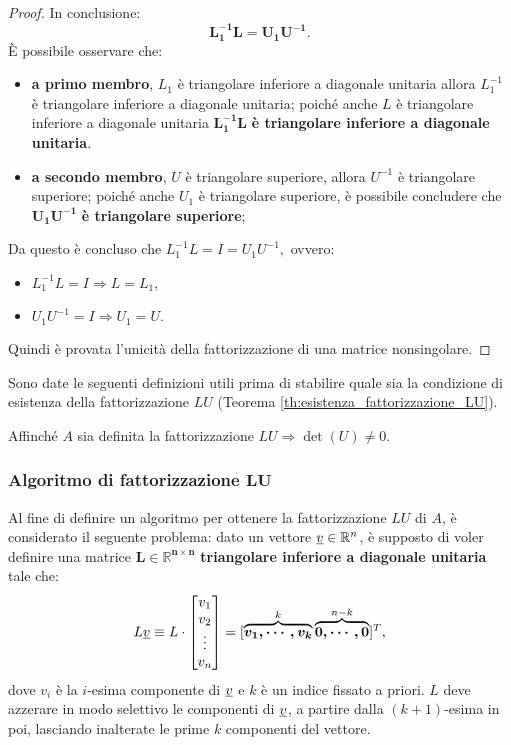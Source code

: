 \begin{proof}
    \noindent In conclusione: \begin{equation*}
        \boldsymbol{L_1^{-1}L}=\boldsymbol{U_1U^{-1}}.
    \end{equation*}
    È possibile osservare che:
    \begin{itemize}
    	\item \textbf{a primo membro}, $L_1$ è triangolare inferiore a diagonale unitaria allora $L_1^{-1}$ è triangolare inferiore a diagonale unitaria; poiché anche $L$ è triangolare inferiore a diagonale unitaria $\boldsymbol{L_1^{-1}L}$ \textbf{è triangolare inferiore a diagonale unitaria}.
        \item \textbf{a secondo membro}, $U$ è triangolare superiore, allora $U^{-1}$ è triangolare superiore; poiché anche $U_1$ è triangolare superiore, è possibile concludere che $\boldsymbol{U_1U^{-1}}$ \textbf{è triangolare superiore};
    \end{itemize}
    Da questo è concluso che $L_1^{-1}L=I=U_1U^{-1},$ ovvero:
    \begin{itemize}
        \item $L_1^{-1}L=I\Rightarrow L=L_1$,
        \item $U_1U^{-1}=I\Rightarrow U_1=U.$
    \end{itemize}
    Quindi è provata l'unicità della fattorizzazione di una matrice \gls{nonsingolare}.
\end{proof}

Sono date le seguenti definizioni utili prima di stabilire quale sia la condizione di esistenza della fattorizzazione $LU$ (Teorema \ref{th:esistenza_fattorizzazione_LU}).

\begin{remark}
    Affinché $A$ sia definita la fattorizzazione $LU\Rightarrow\det(U)\neq 0$.
\end{remark}

\subsubsection{Algoritmo di fattorizzazione \texorpdfstring{$\boldsymbol{LU}$}{LU}}

Al fine di definire un algoritmo per ottenere la fattorizzazione $LU$ di $A$, è considerato il seguente problema: dato un vettore $\uline v\in\mathbb R^n$, è supposto di voler definire una matrice $\boldsymbol {L\in\mathbb R^{n\times n}}$ \textbf{triangolare inferiore a diagonale unitaria} tale che:
\begin{equation}\label{eq:Lv}
    L\uline v \equiv L\cdot \begin{bmatrix}
        v_1\\
        v_2\\
        \vdots\\
        v_n
    \end{bmatrix}=[\overbrace{\boldsymbol{v_1,\cdots, v_k}}^{k}\overbrace{\boldsymbol{0,\cdots, 0}}^{n-k}]^T,
\end{equation}
dove $v_i$ è la $i$-esima componente di $\uline v$ e $k$ è un indice fissato a priori. $L$ deve azzerare in modo selettivo le componenti di $\uline v$, a partire dalla $(k+1)$-esima in poi, lasciando inalterate le prime $k$ componenti del vettore.

